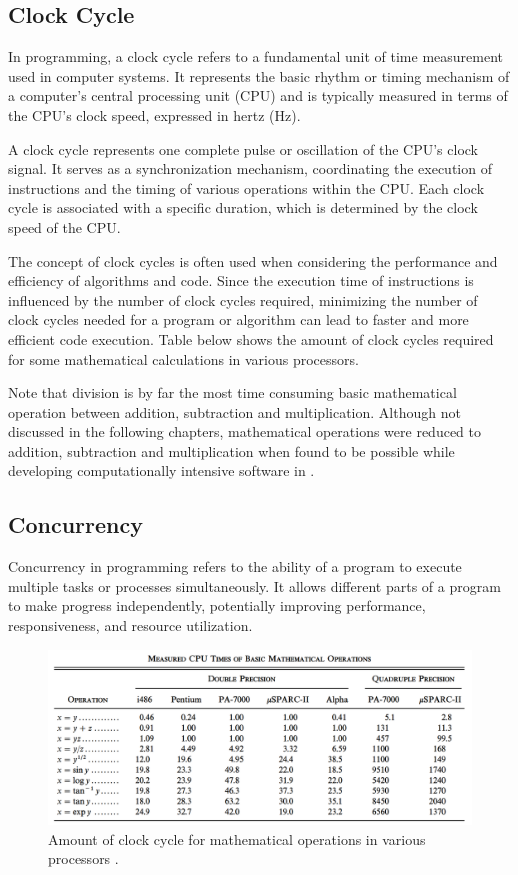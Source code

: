 \documentclass[a4paper,oneside,12pt]{report}
\numberwithin{equation}{chapter}
\begin{document}
\subsection{Clock Cycle}

In programming, a clock cycle refers to a fundamental unit of time measurement used in computer systems. 
It represents the basic rhythm or timing mechanism of a computer's central processing unit (CPU) and is typically measured in terms of the CPU's clock speed, expressed in hertz (Hz).

A clock cycle represents one complete pulse or oscillation of the CPU's clock signal. 
It serves as a synchronization mechanism, coordinating the execution of instructions and the timing of various operations within the CPU.
Each clock cycle is associated with a specific duration, which is determined by the clock speed of the CPU.

The concept of clock cycles is often used when considering the performance and efficiency of algorithms and code. 
Since the execution time of instructions is influenced by the number of clock cycles required, minimizing the number of clock cycles needed for a program or algorithm can lead to faster and more efficient code execution.
Table below shows the amount of clock cycles required for some mathematical calculations in various processors.

Note that division is by far the most time consuming basic mathematical operation between addition, subtraction and multiplication.
Although not discussed in the following chapters, mathematical operations were reduced to addition, subtraction and multiplication when found to be possible while developing computationally intensive software in .
\subsection{Concurrency}

Concurrency in programming refers to the ability of a program to execute multiple tasks or processes simultaneously. It allows different parts of a program to make progress independently, potentially improving performance, responsiveness, and resource utilization.

\vspace{18pt}
\begin{figure}[H]
    \centering
    \includegraphics[width=.95\textwidth]{./figures/cpu_instruction_speed.png}
    \vspace{-3pt}
    \caption{Amount of clock cycle for mathematical operations in various processors \cite{cpu_instruction_speed}.}
\end{figure}
\end{document}
